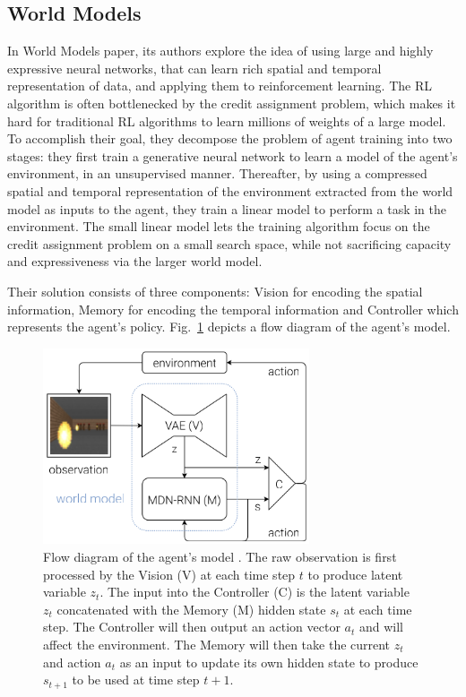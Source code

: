 \subsection{World Models}

In World Models \cite{Algo.WorldModels} paper, its authors explore the idea of using large and highly expressive neural networks, that can learn rich spatial and temporal representation of data, and applying them to reinforcement learning. The RL algorithm is often bottlenecked by the credit assignment problem, which makes it hard for traditional RL algorithms to learn millions of weights of a large model. To accomplish their goal, they decompose the problem of agent training into two stages: they first train a generative neural network to learn a model of the agent's environment, in an unsupervised manner. Thereafter, by using a compressed spatial and temporal representation of the environment extracted from the world model as inputs to the agent, they train a linear model to perform a task in the environment. The small linear model lets the training algorithm focus on the credit assignment problem on a small search space, while not sacrificing capacity and expressiveness via the larger world model.

Their solution consists of three components: Vision for encoding the spatial information, Memory for encoding the temporal information and Controller which represents the agent's policy. Fig.~\ref{Fig.WorldModels} depicts a flow diagram of the agent's model.

\begin{figure}[H]
\includegraphics[width=0.7\textwidth,keepaspectratio]{figures/WorldModels.png}
\caption[Flow diagram of the World Models agent's model]{Flow diagram of the agent's model \protect\cite{Algo.WorldModels}. The raw observation is first processed by the Vision (V) at each time step $t$ to produce latent variable $z_t$. The input into the Controller (C) is the latent variable $z_t$ concatenated with the Memory (M) hidden state $s_t$ at each time step. The Controller will then output an action vector $a_t$ and will affect the environment. The Memory will then take the current $z_t$ and action $a_t$ as an input to update its own hidden state to produce $s_{t+1}$ to be used at time step $t + 1$.}
\label{Fig.WorldModels}
\end{figure}

